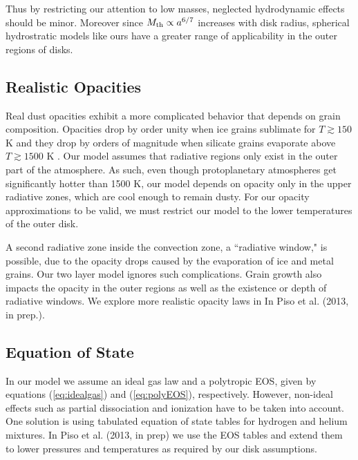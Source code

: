 \documentclass[apj, numberedappendix]{emulateapj}
\begin{document}
Thus by restricting our attention to low masses, neglected hydrodynamic effects should be minor.   Moreover since $M_{\rm th} \propto a^{6/7}$ increases with disk radius, spherical hydrostratic models like ours have a greater range of applicability in the outer regions of disks. 


\subsection{Realistic Opacities}\label{sec:op}

Real dust opacities exhibit a more complicated behavior that depends on grain composition.  Opacities drop by order unity when ice grains sublimate for $T \gtrsim 150$ K and they drop by orders of magnitude when silicate grains evaporate above $T \gtrsim 1500$ K \citep{semenov03, FerAle05}. Our model assumes that radiative regions only exist in the outer part of the atmosphere. As such, even though protoplanetary atmospheres get significantly hotter than 1500 K, our model depends on opacity only in the upper radiative zones, which are cool enough to remain dusty. For our opacity approximations to be valid, we must restrict our model to the lower temperatures of the outer disk.   

A second radiative zone inside the convection zone, a ``radiative window," is possible, due to the opacity drops caused by the evaporation of ice and metal grains. Our two layer model ignores such complications. Grain growth also impacts the opacity in the outer regions as well as the existence or depth of radiative windows. We explore more realistic opacity laws in  In Piso et al. (2013, in prep.).



 \subsection{Equation of State}
 \label{sec:EOS}
 
 In our model we assume an ideal gas law and a polytropic EOS, given by equations (\ref{eq:idealgas}) and (\ref{eq:polyEOS}), respectively. However, non-ideal effects such as partial dissociation and ionization have to be taken into account. One solution is using tabulated equation of state tables for hydrogen and helium mixtures. In Piso et al. (2013, in prep) we use the \citet{saumon95} EOS tables and extend them to lower pressures and temperatures as required by our disk assumptions.
\end{document}
